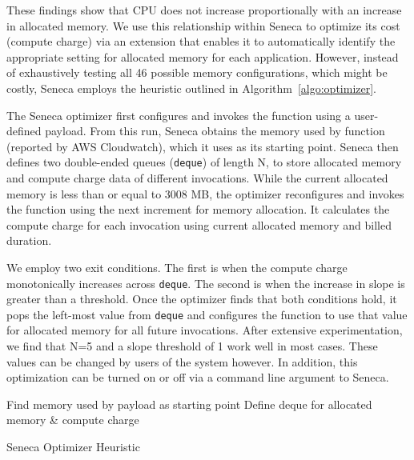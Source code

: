 These findings show that CPU does not increase proportionally with
an increase in allocated memory.  We use this relationship within
Seneca to optimize its cost (compute charge) via an extension
that enables it to automatically identify the appropriate
setting for allocated memory for each application.
However, instead of exhaustively testing all 46 possible 
memory configurations, which might be costly,  
Seneca employs the heuristic outlined in
Algorithm~\ref{algo:optimizer}. 

The Seneca optimizer first configures and invokes the function using 
a user-defined payload.  From this run, Seneca obtains the memory 
used by function (reported by AWS Cloudwatch), 
which it uses as its starting point.
Seneca then defines two double-ended queues 
(\texttt{deque}) of length N, to store 
allocated memory and compute charge data of different
invocations. While the current 
allocated memory is less than or equal to 3008 MB, 
the optimizer reconfigures and invokes the function 
using the next increment for memory allocation.  It 
calculates the compute charge for each invocation 
using current allocated memory and billed duration. 

We employ two exit conditions.  The first is when the 
compute charge monotonically increases across \texttt{deque}. 
The second is when the increase in slope is greater than a threshold. 
Once the optimizer finds that both conditions hold, 
it pops the left-most value from \texttt{deque} and configures 
the function to use that value for allocated memory for all future invocations.
After extensive experimentation, we find that 
N=5 and a slope threshold of 1 work well in most cases.
These values can be changed by users of the system however.
In addition, this optimization can be turned on or off via a command line
argument to Seneca.

\begin{algorithm}[]
\SetAlgoLined
{}
Find memory used by payload as starting point\;
Define deque for allocated memory \& compute charge\;
 \caption{Seneca Optimizer Heuristic}
 \label{algo:optimizer}
\end{algorithm}

